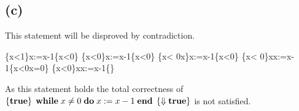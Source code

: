 \documentclass[12pt]{scrartcl}
\begin{document}
	\subsection*{(c)}
	
	This statement will be disproved by contradiction.\\
	
	\begin{center}
	\begin{prooftree}
	 {\left\{x<1\right\}\;x:=x-1\;\left\{x<0\right\}}
	 {\left\{x<0\right\}\;x:=x-1\;\left\{x<0\right\}}
	 {\left\{x< 0\wedge x\right\}\;x:=x-1\;\left\{x<0\right\}}
	 {\left\{x< 0\right\}\;\;x\;\;x:=x-1\;\;\left\{x<0\wedge x=0\right\}}
	 {\left\{x<0\right\}\;\;x\;\;x:=x-1\;\;\left\{\right\}}
	\end{prooftree}
	\end{center}
	
	As this statement holds the total correctness of $\left\{\text{\textbf{true}}\right\}\;\text{\textbf{while}}\;x\neq 0\;\text{\textbf{do}}\;x:=x-1\;\text{\textbf{end}}\;\left\{\Downarrow\text{\textbf{true}}\right\}$ is not satisfied.
	
	
\end{document}
